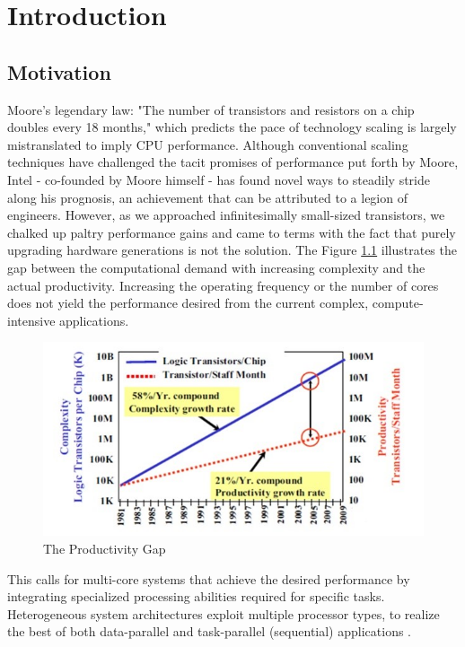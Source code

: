\chapter{Introduction}
\label{ch1_introduction}
\section{Motivation}
\label{sect1_1}
Moore’s legendary law: "The number of transistors and resistors on a chip doubles every 18 months," which predicts the pace of technology scaling is largely mistranslated to imply CPU performance. Although conventional scaling techniques have challenged the tacit promises of performance put forth by Moore, Intel - co-founded by Moore himself - has found novel ways to steadily stride along his prognosis, an achievement that can be attributed to a legion of engineers. However, as we approached infinitesimally small-sized transistors, we chalked up paltry performance gains and came to terms with the fact that purely upgrading hardware generations is not the solution. 
\newline \newline
The Figure \ref{fig:sematech} illustrates the gap between the computational demand with increasing complexity and the actual productivity. Increasing the operating frequency or the number of cores does not yield the performance desired from the current complex, compute-intensive applications. \newline \newline
\begin{figure}[h!]
  \includegraphics[width=\linewidth]{figures/sematech.jpg}
  \caption{The Productivity Gap
  \cite{industry1999international}}
  \label{fig:sematech}
\end{figure}
This calls for multi-core systems that achieve the desired performance by integrating specialized processing abilities required for specific tasks. Heterogeneous system architectures exploit multiple processor types, to realize the best of both data-parallel and task-parallel (sequential) applications \cite{amd_resources}.\newline \newline
